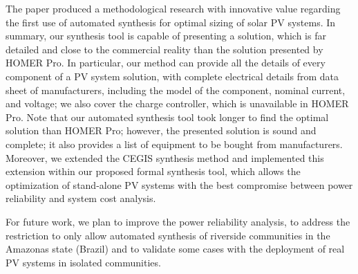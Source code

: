 \documentclass[journal]{IEEEtran}
\begin{document}
The paper produced a methodological research with innovative value regarding the first use of automated synthesis for optimal sizing of solar PV systems.
In summary, our synthesis tool is capable of presenting a solution, which is far detailed and close to the commercial reality than the solution presented by HOMER Pro. In particular, our method can provide all the details of every component of a PV system solution, with complete electrical details from data sheet of manufacturers, including the model of the component, nominal current, and voltage; we also cover the charge controller, which is unavailable in HOMER Pro. Note that our automated synthesis tool took longer to find the optimal solution than HOMER Pro; however, the presented solution is sound and complete; it also provides a list of equipment to be bought from manufacturers. Moreover, we extended the CEGIS synthesis method and implemented this extension within our proposed formal synthesis tool, which allows the optimization of stand-alone PV systems with the best compromise between power reliability and system cost analysis.

For future work, we plan to improve the power reliability analysis, to address the restriction to only allow automated synthesis of riverside communities in the Amazonas state (Brazil) and to validate some cases with the deployment of real PV systems in isolated communities.

%
%

\end{document}
